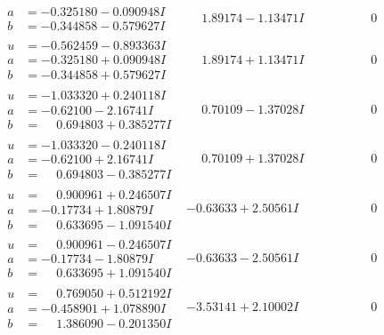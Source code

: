 \documentclass[1p]{elsarticle_modified}
\theoremstyle{definition}
\begin{document}
$$\begin{array}{c|c|c}
\begin{aligned}
a &= -0.325180 - 0.090948 I \\
b &= -0.344858 - 0.579627 I\end{aligned}
 & \phantom{-}1.89174 - 1.13471 I & \phantom{-0.000000 } 0 \\ \hline\begin{aligned}
u &= -0.562459 - 0.893363 I \\
a &= -0.325180 + 0.090948 I \\
b &= -0.344858 + 0.579627 I\end{aligned}
 & \phantom{-}1.89174 + 1.13471 I & \phantom{-0.000000 } 0 \\ \hline\begin{aligned}
u &= -1.033320 + 0.240118 I \\
a &= -0.62100 - 2.16741 I \\
b &= \phantom{-}0.694803 + 0.385277 I\end{aligned}
 & \phantom{-}0.70109 - 1.37028 I & \phantom{-0.000000 } 0 \\ \hline\begin{aligned}
u &= -1.033320 - 0.240118 I \\
a &= -0.62100 + 2.16741 I \\
b &= \phantom{-}0.694803 - 0.385277 I\end{aligned}
 & \phantom{-}0.70109 + 1.37028 I & \phantom{-0.000000 } 0 \\ \hline\begin{aligned}
u &= \phantom{-}0.900961 + 0.246507 I \\
a &= -0.17734 + 1.80879 I \\
b &= \phantom{-}0.633695 - 1.091540 I\end{aligned}
 & -0.63633 + 2.50561 I & \phantom{-0.000000 } 0 \\ \hline\begin{aligned}
u &= \phantom{-}0.900961 - 0.246507 I \\
a &= -0.17734 - 1.80879 I \\
b &= \phantom{-}0.633695 + 1.091540 I\end{aligned}
 & -0.63633 - 2.50561 I & \phantom{-0.000000 } 0 \\ \hline\begin{aligned}
u &= \phantom{-}0.769050 + 0.512192 I \\
a &= -0.458901 + 1.078890 I \\
b &= \phantom{-}1.386090 - 0.201350 I\end{aligned}
 & -3.53141 + 2.10002 I & \phantom{-0.000000 } 0 \\ \hline\begin{aligned}

\end{aligned}
\end{array}$$
\end{document}
